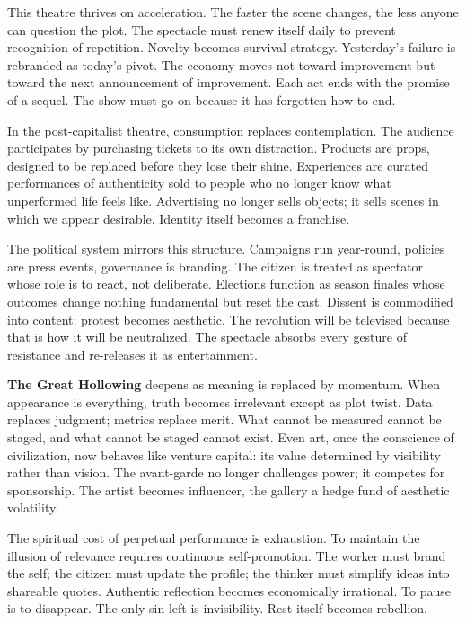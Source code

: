 \documentclass[11pt,twoside]{book}
\begin{document}
This theatre thrives on acceleration.  The faster the scene changes, the less anyone can question the plot.  The spectacle must renew itself daily to prevent recognition of repetition.  Novelty becomes survival strategy.  Yesterday’s failure is rebranded as today’s pivot.  The economy moves not toward improvement but toward the next announcement of improvement.  Each act ends with the promise of a sequel.  The show must go on because it has forgotten how to end.

In the post-capitalist theatre, consumption replaces contemplation.  The audience participates by purchasing tickets to its own distraction.  Products are props, designed to be replaced before they lose their shine.  Experiences are curated performances of authenticity sold to people who no longer know what unperformed life feels like.  Advertising no longer sells objects; it sells scenes in which we appear desirable.  Identity itself becomes a franchise.

The political system mirrors this structure.  Campaigns run year-round, policies are press events, governance is branding.  The citizen is treated as spectator whose role is to react, not deliberate.  Elections function as season finales whose outcomes change nothing fundamental but reset the cast.  Dissent is commodified into content; protest becomes aesthetic.  The revolution will be televised because that is how it will be neutralized.  The spectacle absorbs every gesture of resistance and re-releases it as entertainment.

\textbf{The Great Hollowing} deepens as meaning is replaced by momentum.  When appearance is everything, truth becomes irrelevant except as plot twist.  Data replaces judgment; metrics replace merit.  What cannot be measured cannot be staged, and what cannot be staged cannot exist.  Even art, once the conscience of civilization, now behaves like venture capital: its value determined by visibility rather than vision.  The avant-garde no longer challenges power; it competes for sponsorship.  The artist becomes influencer, the gallery a hedge fund of aesthetic volatility.

The spiritual cost of perpetual performance is exhaustion.  To maintain the illusion of relevance requires continuous self-promotion.  The worker must brand the self; the citizen must update the profile; the thinker must simplify ideas into shareable quotes.  Authentic reflection becomes economically irrational.  To pause is to disappear.  The only sin left is invisibility.  Rest itself becomes rebellion.
\end{document}
